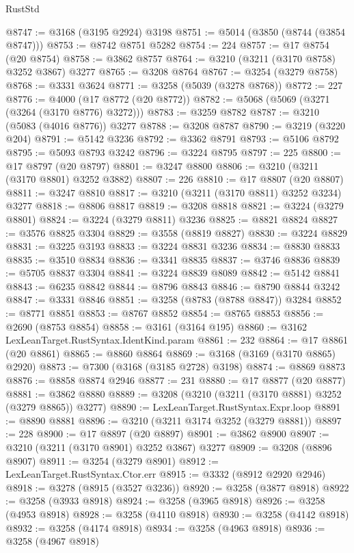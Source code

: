 \begin{lexlean}{RustStd}
\begin{coremodule}
@8747 := @3168 (@3195 @2924) @3198
@8751 := @5014 (@3850 (@8744 (@3854 @8747)))
@8753 := @8742 @8751 @5282
@8754 := 224
@8757 := @17 @8754 (@20 @8754)
@8758 := @3862 @8757
@8764 := @3210 (@3211 (@3170 @8758) @3252 @3867) @3277
@8765 := @3208 @8764
@8767 := @3254 (@3279 @8758)
@8768 := @3331 @3624
@8771 := @3258 (@5039 (@3278 @8768))
@8772 := 227
@8776 := @4000 (@17 @8772 (@20 @8772))
@8782 := @5068 (@5069 (@3271 (@3264 (@3170 @8776) @3272)))
@8783 := @3259 @8782
@8787 := @3210 (@5083 (@4016 @8776)) @3277
@8788 := @3208 @8787
@8790 := @3219 (@3220 @204)
@8791 := @5142 @3236
@8792 := @3362 @8791
@8793 := @5106 @8792
@8795 := @5093 @8793 @3242
@8796 := @3224 @8795
@8797 := 225
@8800 := @17 @8797 (@20 @8797)
@8801 := @3247 @8800
@8806 := @3210 (@3211 (@3170 @8801) @3252 @3882)
@8807 := 226
@8810 := @17 @8807 (@20 @8807)
@8811 := @3247 @8810
@8817 := @3210 (@3211 (@3170 @8811) @3252 @3234) @3277
@8818 := @8806 @8817
@8819 := @3208 @8818
@8821 := @3224 (@3279 @8801)
@8824 := @3224 (@3279 @8811) @3236
@8825 := @8821 @8824
@8827 := @3576 @8825 @3304
@8829 := @3558 (@8819 @8827)
@8830 := @3224 @8829
@8831 := @3225 @3193
@8833 := @3224 @8831 @3236
@8834 := @8830 @8833
@8835 := @3510 @8834
@8836 := @3341 @8835
@8837 := @3746 @8836
@8839 := @5705 @8837 @3304
@8841 := @3224 @8839 @8089
@8842 := @5142 @8841
@8843 := @6235 @8842
@8844 := @8796 @8843
@8846 := @8790 @8844 @3242
@8847 := @3331 @8846
@8851 := @3258 (@8783 (@8788 @8847)) @3284
@8852 := @8771 @8851
@8853 := @8767 @8852
@8854 := @8765 @8853
@8856 := @2690 (@8753 @8854)
@8858 := @3161 (@3164 @195)
@8860 := @3162 LexLeanTarget.RustSyntax.IdentKind.param
@8861 := 232
@8864 := @17 @8861 (@20 @8861)
@8865 := @8860 @8864
@8869 := @3168 (@3169 (@3170 @8865) @2920)
@8873 := @7300 (@3168 (@3185 @2728) @3198)
@8874 := @8869 @8873
@8876 := @8858 @8874 @2946
@8877 := 231
@8880 := @17 @8877 (@20 @8877)
@8881 := @3862 @8880
@8889 := @3208 (@3210 (@3211 (@3170 @8881) @3252 (@3279 @8865)) @3277)
@8890 := LexLeanTarget.RustSyntax.Expr.loop
@8891 := @8890 @8881
@8896 := @3210 (@3211 @3174 @3252 (@3279 @8881))
@8897 := 228
@8900 := @17 @8897 (@20 @8897)
@8901 := @3862 @8900
@8907 := @3210 (@3211 (@3170 @8901) @3252 @3867) @3277
@8909 := @3208 (@8896 @8907)
@8911 := @3254 (@3279 @8901)
@8912 := LexLeanTarget.RustSyntax.Ctor.err
@8915 := @3332 (@8912 @2920 @2946)
@8918 := @3278 (@8915 (@3527 @3236))
@8920 := @3258 (@3877 @8918)
@8922 := @3258 (@3933 @8918)
@8924 := @3258 (@3965 @8918)
@8926 := @3258 (@4953 @8918)
@8928 := @3258 (@4110 @8918)
@8930 := @3258 (@4142 @8918)
@8932 := @3258 (@4174 @8918)
@8934 := @3258 (@4963 @8918)
@8936 := @3258 (@4967 @8918)

\end{coremodule}
\end{lexlean}
